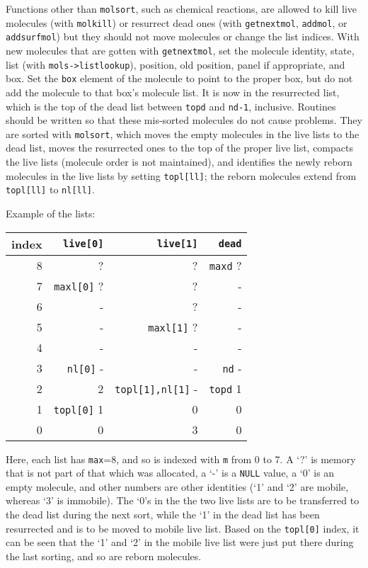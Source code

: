 \documentclass {book}
\begin{document}
Functions other than \texttt{molsort}, such as chemical reactions, are allowed to kill live molecules (with \texttt{molkill}) or resurrect dead ones (with \texttt{getnextmol}, \texttt{addmol}, or \texttt{addsurfmol}) but they should not move molecules or change the list indices. With new molecules that are gotten with \texttt{getnextmol}, set the molecule identity, state, list (with \texttt{mols->listlookup}), position, old position, panel if appropriate, and box. Set the \texttt{box} element of the molecule to point to the proper box, but do not add the molecule to that box's molecule list. It is now in the resurrected list, which is the top of the dead list between \texttt{topd} and \texttt{nd-1}, inclusive. Routines should be written so that these mis-sorted molecules do not cause problems. They are sorted with \texttt{molsort}, which moves the empty molecules in the live lists to the dead list, moves the resurrected ones to the top of the proper live list, compacts the live lists (molecule order is not maintained), and identifies the newly reborn molecules in the live lists by setting \texttt{topl[ll]}; the reborn molecules extend from \texttt{topl[ll]} to \texttt{nl[ll]}.

Example of the lists:

\begin{longtable}[c]{rrrr}
index & \texttt{live[0]} & \texttt{live[1]} & \texttt{dead}\\
\hline
8 & ? & ? & \texttt{maxd} ?\\
7 & \texttt{maxl[0]} ? & ? & -\\
6 & - & ? & -\\
5 & - & \texttt{maxl[1]} ? & -\\
4 & - & - & -\\
3 & \texttt{nl[0]} - & - & \texttt{nd} -\\
2 & 2 & \texttt{topl[1],nl[1]} - & \texttt{topd} 1\\
1 & \texttt{topl[0]} 1 & 0 & 0\\
0 & 0 & 3 & 0\\
 \end{longtable}

Here, each list has \texttt{max}=8, and so is indexed with \texttt{m} from 0 to 7. A `?' is memory that is not part of that which was allocated, a `-' is a \texttt{NULL} value, a `0' is an empty molecule, and other numbers are other identities (`1' and `2' are mobile, whereas `3' is immobile). The `0's in the the two live lists are to be transferred to the dead list during the next sort, while the `1' in the dead list has been resurrected and is to be moved to mobile live list. Based on the \texttt{topl[0]} index, it can be seen that the `1' and `2' in the mobile live list were just put there during the last sorting, and so are reborn molecules.
\end{document}
